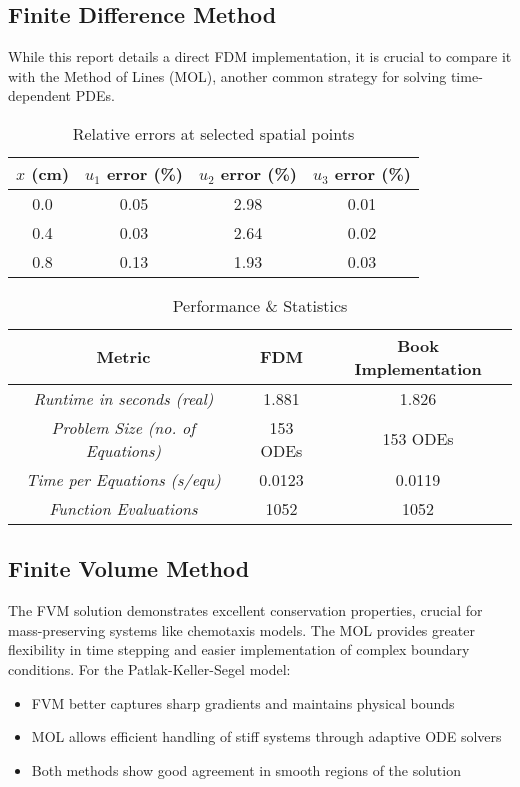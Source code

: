 \documentclass[conference]{IEEEtran}
\begin{document}
\subsection{Finite Difference Method}

While this report details a direct FDM implementation, it is crucial to compare it with the Method of Lines (MOL), another common strategy for solving time-dependent PDEs.



\begin{table}[H]
\centering
\caption{Relative errors at selected spatial points}
\begin{tabular}{|c|c|c|c|}
\hline
$x$ (cm) & $u_1$ error (\%) & $u_2$ error (\%) & $u_3$ error (\%) \\
\hline
0.0 & 0.05& 2.98& 0.01\\
0.4 & 0.03& 2.64& 0.02\\
0.8 & 0.13& 1.93& 0.03\\
\hline
\end{tabular}
\end{table}

 




\begin{table}[H]
\centering
\caption{Performance \& Statistics}
\begin{tabular}{|c|c|c|}
\hline
Metric & FDM& Book Implementation \\
\hline
\textit{Runtime in seconds (real)} & 1.881& 1.826 \\
\textit{Problem Size (no. of Equations)} & 153 ODEs & 153 ODEs \\
\textit{Time per Equations (s/equ)} & 0.0123& 0.0119\\
\textit{Function Evaluations} & 1052& 1052 \\
\hline
\end{tabular}
\end{table}

\subsection{Finite Volume Method}
The FVM solution demonstrates excellent conservation properties, crucial for mass-preserving systems like chemotaxis models. The MOL provides greater flexibility in time stepping and easier implementation of complex boundary conditions. For the Patlak-Keller-Segel model:

\begin{itemize}
\item FVM better captures sharp gradients and maintains physical bounds
\item MOL allows efficient handling of stiff systems through adaptive ODE solvers
\item Both methods show good agreement in smooth regions of the solution
\end{itemize}
\end{document}
